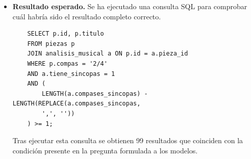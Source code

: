 \begin{itemize}
No se pudo identificar si las síncopas están ligadas específicamente entre el segundo pulso de un compás y el primero del siguiente de forma sistemática con los datos disponibles."
\item \textbf{Resultado esperado.} Se ha ejecutado una consulta SQL para comprobar cuál habría sido el resultado completo correcto.
    \begin{verbatim} 
    SELECT p.id, p.titulo
    FROM piezas p
    JOIN analisis_musical a ON p.id = a.pieza_id
    WHERE p.compas = '2/4'
    AND a.tiene_sincopas = 1
    AND (
        LENGTH(a.compases_sincopas) - LENGTH(REPLACE(a.compases_sincopas, 
        ',', ''))
    ) >= 1;
    \end{verbatim} 
    Tras ejecutar esta consulta se obtienen 99 resultados que coinciden con la condición presente en la pregunta formulada a los modelos.



\end{itemize}

